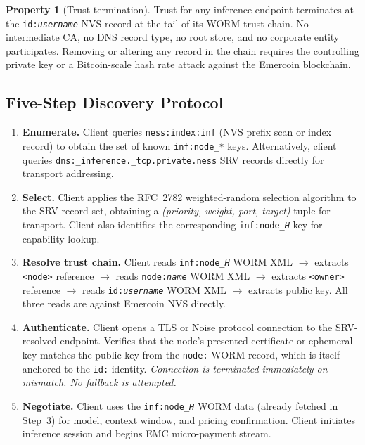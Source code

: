 \documentclass[11pt,a4paper]{article}
\theoremstyle{definition}
\newtheorem{property}{Property}[section]
\begin{document}
\begin{property}[Trust termination]
Trust for any inference endpoint terminates at the \texttt{id:\textit{username}}
NVS record at the tail of its WORM trust chain.  No intermediate CA, no DNS
record type, no root store, and no corporate entity participates.  Removing
or altering any record in the chain requires the controlling private key or
a Bitcoin-scale hash rate attack against the Emercoin blockchain.
\end{property}

\subsection{Five-Step Discovery Protocol}

\begin{enumerate}[label=\textbf{Step \arabic*:}, leftmargin=*, wide=0pt]
  \item \textbf{Enumerate.}  Client queries \texttt{ness:index:inf} (NVS
    prefix scan or index record) to obtain the set of known
    \texttt{inf:node\_*} keys.  Alternatively, client queries
    \texttt{dns:\_inference.\_tcp.private.ness} SRV records directly for
    transport addressing.

  \item \textbf{Select.}  Client applies the RFC~2782 weighted-random
    selection algorithm to the SRV record set, obtaining a
    \textit{(priority, weight, port, target)} tuple for transport.
    Client also identifies the corresponding \texttt{inf:node\_\textit{H}}
    key for capability lookup.

  \item \textbf{Resolve trust chain.}  Client reads
    \texttt{inf:node\_\textit{H}} WORM XML $\to$ extracts \texttt{<node>}
    reference $\to$ reads \texttt{node:\textit{name}} WORM XML $\to$
    extracts \texttt{<owner>} reference $\to$ reads
    \texttt{id:\textit{username}} WORM XML $\to$ extracts public key.
    All three reads are against Emercoin NVS directly.

  \item \textbf{Authenticate.}  Client opens a TLS or Noise protocol
    connection to the SRV-resolved endpoint.  Verifies that the node's
    presented certificate or ephemeral key matches the public key from the
    \texttt{node:} WORM record, which is itself anchored to the
    \texttt{id:} identity.  \emph{Connection is terminated immediately on
    mismatch.  No fallback is attempted.}

  \item \textbf{Negotiate.}  Client uses the \texttt{inf:node\_\textit{H}}
    WORM data (already fetched in Step~3) for model, context window, and
    pricing confirmation.  Client initiates inference session and begins
    EMC micro-payment stream.
\end{enumerate}
\end{document}
